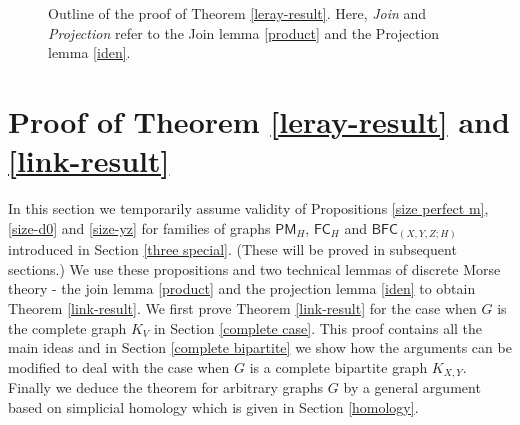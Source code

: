 \documentclass[10pt]{amsart}
\theoremstyle{definition}
\begin{document}
\begin{figure}
		\caption{Outline of the proof of Theorem \ref{leray-result}. Here, \textit{Join} and \textit{Projection} refer to the Join lemma \ref{product} and the Projection lemma \ref{iden}.}
		\label{fig_outline}
	\end{figure}
	
	
	\section{Proof of Theorem \ref{leray-result} and \ref{link-result}} \label{proof of main}
	
	In this section we temporarily assume validity of Propositions \ref{size perfect m}, \ref{size-d0} and \ref{size-yz} for families of graphs $\mathsf{PM}_H$, $\mathsf{FC}_H$ and $\mathsf{BFC}_{(X,Y,Z;H)}$ introduced in Section \ref{three special}. (These will be proved in subsequent sections.) We use these propositions and two technical lemmas of discrete Morse theory - the join lemma \ref{product} and the projection lemma \ref{iden} to obtain Theorem \ref{link-result}. We first prove Theorem \ref{link-result} for the case when $G$ is the complete graph $K_V$ in Section \ref{complete case}. This proof contains all the main ideas and in Section \ref{complete bipartite} we show how the arguments can be modified to deal with the case when $G$ is a complete bipartite graph $K_{X,Y}$. Finally we deduce the theorem for arbitrary graphs $G$ by a general argument based on simplicial homology which is given in Section \ref{homology}.
	
\end{document}

